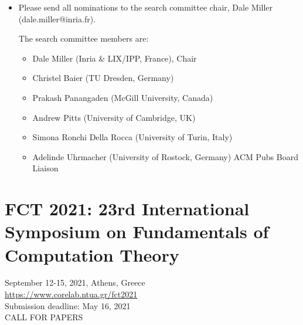 \documentclass[prodmode,acmtecs]{acmsmall} %
\begin{document}
\begin{itemize}
\item  Please send all nominations to the search committee chair, Dale Miller (dale.miller@inria.fr).  
 
  The search committee members are: 
 
\begin{itemize}\item  Dale Miller (Inria \& LIX/IPP, France), Chair
\item  Christel Baier (TU Dresden, Germany)
\item  Prakash Panangaden (McGill University, Canada)
\item  Andrew Pitts (University of Cambridge, UK)
\item  Simona Ronchi Della Rocca (University of Turin, Italy)
\item  Adelinde Uhrmacher (University of Rostock, Germany) ACM Pubs Board Liaison
\end{itemize} 
\end{itemize}\section{FCT 2021: 23rd International Symposium on Fundamentals of Computation Theory}\label{FCT2021}  September 12-15, 2021, Athens, Greece\\ 
  \href{https://www.corelab.ntua.gr/fct2021}{https://www.corelab.ntua.gr/fct2021}\\ 
  Submission deadline: May 16, 2021\\ 
CALL FOR PAPERS 
\end{document}
